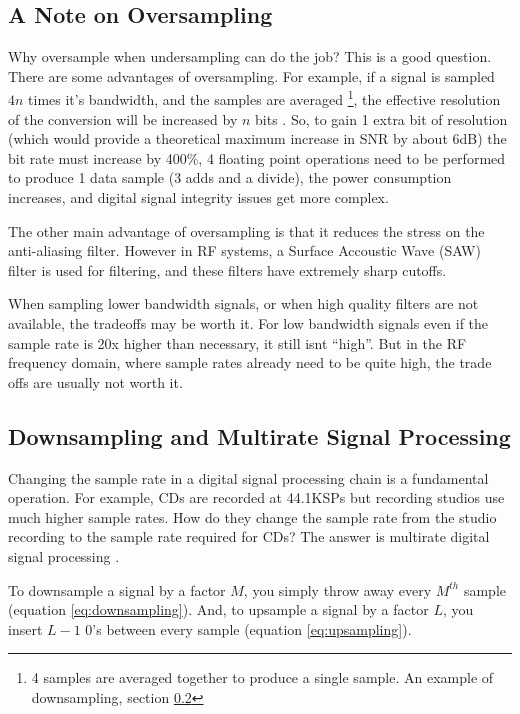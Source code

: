 \documentclass[a4paper, 12pt]{article}
\begin{document}
\subsection{A Note on Oversampling}
Why oversample when undersampling can do the job\cite{why_oversample}?  This is a good question.  There are some advantages of oversampling.  For example, if a signal is sampled $4n$ times it's bandwidth, and the samples are averaged \footnote{4 samples are averaged together to produce a single sample.  An example of downsampling, section \ref{sec:downsampling}}, the effective resolution of the conversion will be increased by $n$ bits \cite{oversample_extra_bits}.  So, to gain 1 extra bit of resolution (which would provide a theoretical maximum increase in SNR by about 6dB) the bit rate must increase by 400\%, 4 floating point operations need to be performed to produce 1 data sample (3 adds and a divide), the power consumption increases, and digital signal integrity issues get more complex.

The other main advantage of oversampling is that it reduces the stress on the anti-aliasing filter.  However in RF systems, a Surface Accoustic Wave (SAW) filter is used for filtering, and these filters have extremely sharp cutoffs.

When sampling lower bandwidth signals, or when high quality filters are not available, the tradeoffs may be worth it.  For low bandwidth signals even if the sample rate is 20x higher than necessary, it still isnt ``high''.  But in the RF frequency domain, where sample rates already need to be quite high, the trade offs are usually not worth it.

\subsection{Downsampling and Multirate Signal Processing}
\label{sec:downsampling}
Changing the sample rate in a digital signal processing chain is a fundamental operation.  For example, CDs are recorded at 44.1KSPs but recording studios use much higher sample rates.  How do they change the sample rate from the studio recording to the sample rate required for CDs?  The answer is multirate digital signal processing \cite{multirate1} \cite{multirate2}.

To downsample a signal by a factor $M$, you simply throw away every $M^{th}$ sample (equation \ref{eq:downsampling}).  And, to upsample a signal by a factor $L$, you insert $L - 1$ 0's between every sample (equation \ref{eq:upsampling}).
\end{document}
